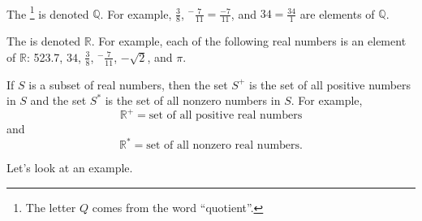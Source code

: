 \begin{defn}
\label{defn_sets_of_real_numbers}  
~
    \begin{apart}
        \item The \footnote{The letter $Q$ comes from the word ``quotient''.} is 
        denoted $\mathbb{Q}$.  For example, $\frac{3}{8}$, $^-\frac{7}{11} = \frac{-7}{11}$, and $34 = \frac{34}{1}$ are elements of $\mathbb{Q}$.
       
        \item The  is denoted
        $\mathbb{R}.$  For example, each of the following real numbers is an element of $\mathbb{R}$: 523.7, $34$, $\frac{3}{8}$, $^-\frac{7}{11}$, $-\sqrt{2}$, and $\pi$.
        
        \item If $S$ is a subset of real numbers, then the set $S^+$ is the set of all positive numbers in $S$ and the set $S^*$ is the set of all nonzero numbers in $S$.  For example, 
        $$\mathbb{R}^+ = \text{set of all positive real numbers}$$
        and  $$\mathbb{R}^* = \text{set of all nonzero real numbers}.$$       
    \end{apart}
\end{defn}

Let's look at an example.

